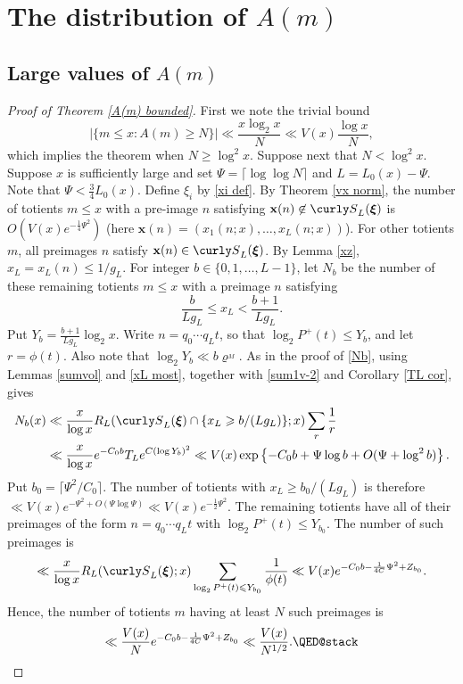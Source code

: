 \documentclass[11pt]{amsart}
\theoremstyle{remark}
\theoremstyle{plain}
\numberwithin{equation}{section}
\renewcommand{\(}{\left(}
\renewcommand{\)}{\right)}
\newcommand{\fancyS}{{\curly S}}
\renewcommand{\le}{\leqslant}
\renewcommand{\ge}{\geqslant}
\renewcommand{\rho}{\varrho}
\newcommand{\bxi}{\boldsymbol\xi}
\newcommand{\vxi}{\bxi}
\newcommand{\vx}{\mathbf{x}}
\begin{document}
%
%
%
%
\section{The distribution of $A(m)$}


\subsection{Large values of $A(m)$}


\begin{proof}[Proof of Theorem \ref{A(m) bounded}]
First we note the trivial bound
\[
 | \{ m\le x: A(m)\ge N \}| \ll \frac{x \log_2 x}{N} \ll V(x) \frac{\log x}{N},
\]
which implies the theorem when $N\ge \log^2 x$.  Suppose next that $N<\log^2 x$.
Suppose $x$ is sufficiently large and set $\Psi=\lceil \log\log N \rceil$ and
$L=L_0(x)-\Psi$.  Note that $\Psi < \frac34 L_0(x)$.
Define $\xi_i$ by \eqref{xi def}.
By Theorem \ref{vx norm}, the number of totients $m\le x$
with a pre-image $n$ satisfying $\vx(n)\not\in \fancyS_L(\vxi)$ is
$O(V(x)e^{-\frac14 \Psi^2})$ (here $\vx(n) = (x_1(n;x), \ldots, x_L(n;x))$). 
For other totients $m$, all preimages $n$ satisfy $\vx(n)\in \fancyS_L(\vxi)$.
By Lemma \ref{xz}, $x_L=x_L(n) \le 1/g_L$.  For integer $b\in \{0,1,\ldots,L-1\}$,
let $N_b$ be the number of these remaining totients $m\le x$ with a preimage $n$
satisfying 
$$
\frac{b}{L g_L} \le x_L < \frac{b+1}{Lg_L}.
$$
Put $Y_b=\frac{b+1}{Lg_L}\log_2 x$.
Write $n=q_0 \cdots q_{L} t$, so that $\log_2 P^+(t)\le Y_b$, and let $r=\phi(t)$.
 Also note that $\log_2 Y_b \ll b\rho^{_M}$.  
As in the proof of \eqref{Nb}, using Lemmas \ref{sumvol} and \ref{xL most}, together with
\eqref{sum1v-2} and Corollary \ref{TL cor}, gives
\begin{align*}
N_b(x) &\ll \frac{x}{\log x} R_{L}(\fancyS_L(\vxi) \cap \{x_L\ge b/(Lg_L)\};x) \sum_r
\frac{1}{r} \\
&\ll \frac{x}{\log x} e^{-C_0 b}T_L e^{C(\log Y_b)^2}
\ll  V(x) \exp \left\{ -C_0 b + \Psi \log b  + O(\Psi+\log^2 b) \right\}.
\end{align*}
Put $b_0=\lceil \Psi^2/C_0 \rceil$.  The number of totients with $x_L \ge b_0/(Lg_L)$ 
is therefore $ \ll V(x)e^{-\Psi^2+O(\Psi\log \Psi)} \ll V(x)e^{-\frac12 \Psi^2}$.
The remaining totients have all of their preimages of the form $n=q_0\cdots q_L t$ with
 $\log_2 P^+(t) \le Y_{b_0}$.  The number of such preimages is
\[
 \ll \frac{x}{\log x} R_L(\fancyS_L(\bxi);x) \sum_{\log_2  P^+(t)\le Y_{b_0}} \frac{1}{\phi(t)}
\ll V(x) e^{-C_0 b - \frac{1}{4C}\Psi^2+Z_{b_0}}.
\]
Hence, the number of totients $m$ having at least $N$ such preimages is
\[
 \ll \frac{V(x)}{N} e^{-C_0 b - \frac{1}{4C}\Psi^2+Z_{b_0}} \ll \frac{V(x)}{N^{1/2}}.
\qedhere
\]
\end{proof}
\end{document}
